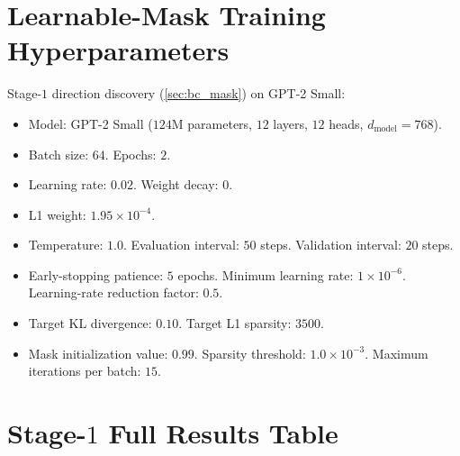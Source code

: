 \section{Learnable-Mask Training Hyperparameters}
\label{app:bc_train}

Stage-$1$ direction discovery (\cref{sec:bc_mask}) on GPT-2 Small:

\begin{itemize}
    \item Model: GPT-2 Small ($124$M parameters, $12$ layers,
    $12$ heads, $d_{\text{model}} = 768$).
    \item Batch size: $64$. Epochs: $2$.
    \item Learning rate: $0.02$. Weight decay: $0$.
    \item L1 weight: $1.95 \times 10^{-4}$.
    \item Temperature: $1.0$. Evaluation interval: $50$ steps.
    Validation interval: $20$ steps.
    \item Early-stopping patience: $5$ epochs.
    Minimum learning rate: $1 \times 10^{-6}$.
    Learning-rate reduction factor: $0.5$.
    \item Target KL divergence: $0.10$. Target L1 sparsity:
    $3500$.
    \item Mask initialization value: $0.99$. Sparsity threshold:
    $1.0 \times 10^{-3}$. Maximum iterations per batch: $15$.
\end{itemize}

\section{Stage-$1$ Full Results Table}
\label{app:bc_results}

